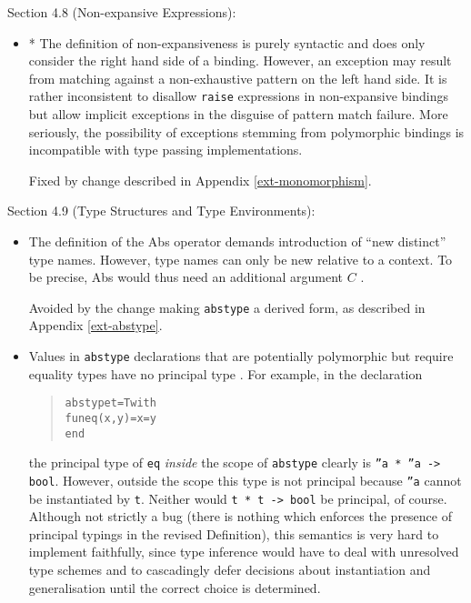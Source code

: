 \documentclass[twoside,titlepage]{article}
\begin{document}
\begin{appendix}
Section 4.8 (Non-expansive Expressions):

\begin{itemize}
\item * The definition of non-expansiveness is purely syntactic and does only consider the right hand side of a binding. However, an exception may result from matching against a non-exhaustive pattern on the left hand side. It is rather inconsistent to disallow {\tt raise} expressions in non-expansive bindings but allow implicit exceptions in the disguise of pattern match failure. More seriously, the possibility of exceptions stemming from polymorphic bindings is incompatible with type passing implementations.

Fixed by change described in Appendix \ref{ext-monomorphism}.
\end{itemize}


Section 4.9 (Type Structures and Type Environments):

\begin{itemize}

\item The definition of the Abs operator demands introduction of ``new distinct'' type names. However, type names can only be new relative to a context. To be precise, Abs would thus need an additional argument $C$ \cite{addenda}.

Avoided by the change making {\tt abstype} a derived form, as described in Appendix \ref{ext-abstype}.

\item Values in {\tt abstype} declarations that are potentially polymorphic but require equality types have no principal type \cite{addenda}. For example, in the declaration

\begin{quote}
\begin{alltt}
abstype t = T with
    fun eq(x,y) = x = y
end
\end{alltt}
\end{quote}

the principal type of {\tt eq} {\em inside} the scope of {\tt abstype} clearly is {\tt ''a * ''a -> bool}. However, outside the scope this type is not principal because {\tt ''a} cannot be instantiated by {\tt t}. Neither would {\tt t * t -> bool} be principal, of course. Although not strictly a bug (there is nothing which enforces the presence of principal typings in the revised Definition), this semantics is very hard to implement faithfully, since type inference would have to deal with unresolved type schemes and to cascadingly defer decisions about instantiation and generalisation until the correct choice is determined.


\end{itemize}
\end{appendix}
\end{document}
